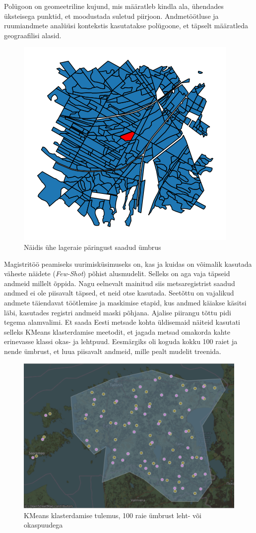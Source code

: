 Polügoon on geomeetriline kujund, mis määratleb kindla ala, ühendades üksteisega
punktid, et moodustada suletud piirjoon. Andmetöötluse ja ruumiandmete analüüsi
kontekstis kasutatakse polügoone, et täpselt määratleda geograafilisi alasid. \cite{WhatLocationPolygon}

\begin{figure}[H]
    \centering
    \includegraphics[width=.5\textwidth]{figures/andmestik/er_id_is10124223.png}
    \caption{Näidis ühe lageraie päringust saadud ümbrus}
    \label{fig:umbrusexample}
\end{figure}

Magistritöö peamiseks uurimisküsimuseks on, kas ja kuidas on võimalik kasutada väheste näidete (\textit{Few-Shot}) põhist alusmudelit. Selleks on aga vaja täpseid andmeid millelt õppida. Nagu eelnevalt mainitud siis metsaregistrist saadud andmed ei ole piisavalt täpsed, et neid otse kasutada. Seetõttu on vajalikud andmete täiendavat töötlemise ja maskimise etapid, kus andmed käiakse käsitsi läbi, kasutades registri andmeid maski põhjana. Ajalise piirangu tõttu pidi tegema alamvalimi. Et saada Eesti metsade kohta üldisemaid näiteid kasutati selleks KMeans klasterdamise meetodit, et jagada metsad omakorda kahte erinevasse klassi okas- ja lehtpuud. Eesmärgiks oli koguda kokku 100 raiet ja nende ümbrust, et luua piisavalt andmeid, mille pealt mudelit treenida.

\begin{figure}[H]
    \centering
    \includegraphics[width=.9\textwidth]{figures/andmestik/kmeansmap.png}
    \caption{KMeans klasterdamise tulemus, 100 raie ümbrust leht- või okaspuudega}
    \label{fig:kmeans}
\end{figure}

